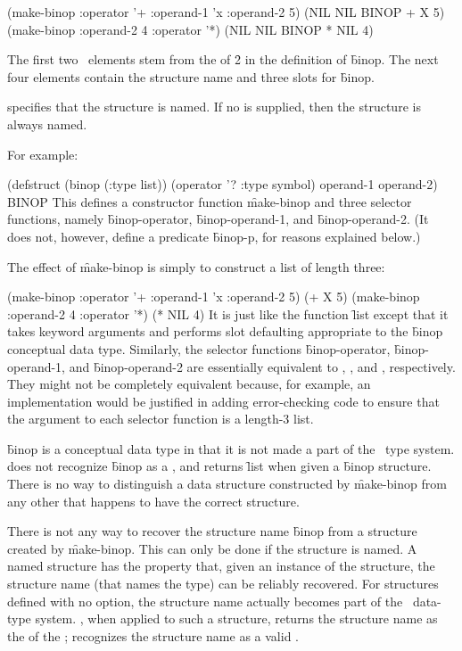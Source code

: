 \code
 (make-binop :operator '+ :operand-1 'x :operand-2 5) \EV (NIL NIL BINOP + X 5)
 (make-binop :operand-2 4 :operator '*) \EV (NIL NIL BINOP * NIL 4)
\endcode

The first two \nil\ elements stem from the  of \f{2}
in the definition of \f{binop}.  The next four elements contain the
structure name and three slots for \f{binop}.  


 specifies that the structure is named.
If no  is supplied,
then the structure is always named.


For example:

\code
 (defstruct (binop (:type list))
   (operator '? :type symbol)
   operand-1
   operand-2) \EV BINOP
\endcode
This defines a constructor function \f{make-binop} and three
selector functions, namely \f{binop-operator}, \f{binop-operand-1},
and \f{binop-operand-2}.  (It does not, however, define a predicate
\f{binop-p}, for reasons explained below.)

The effect of \f{make-binop} is simply to construct a list of length three:

\code
 (make-binop :operator '+ :operand-1 'x :operand-2 5) \EV (+ X 5)  
 (make-binop :operand-2 4 :operator '*) \EV (* NIL 4)
\endcode
It is just like the function \f{list} except that it takes
keyword arguments and performs slot defaulting appropriate to the \f{binop}
conceptual data type.  Similarly, the selector functions
\f{binop-operator}, \f{binop-operand-1},
and \f{binop-operand-2} are essentially equivalent to ,
, and , respectively.  They might not be
completely equivalent because,
for example, an implementation would be justified in adding error-checking
code to ensure that the argument to each selector function is a length-3
list.

\f{binop} is a conceptual data type in that it is not made a part of
the \clisp\ type system.   does not recognize \f{binop} as
a , and  returns \f{list} when
given a \f{binop} structure.  There is no way to distinguish a data
structure constructed by \f{make-binop} from any other  that 
happens to have the correct structure.

There is not any way to recover the structure name \f{binop} from
a structure created by \f{make-binop}.  This can only be done
if the structure is named.
A named structure has the property that, given an instance of the
structure, the structure name (that names the type) can be reliably
recovered.  For structures defined
with no  option, the structure name actually becomes part
of the \clisp\ data-type system.  ,
when applied to such a structure, returns the structure name
as the  of the ;
 recognizes
the structure name as a valid .

